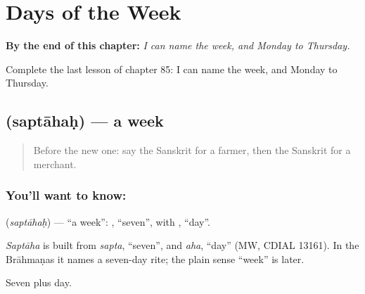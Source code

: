 
\chapter{Days of the Week}
\label{ch:sa-days-of-the-week}

\begin{chapteropening}
\textbf{By the end of this chapter:} \emph{I can name the week, and Monday to Thursday.}

Complete the last lesson of chapter 85: I can name the week, and Monday to Thursday.
\end{chapteropening}

\section[\texorpdfstring{\sk{सप्ताहः} (saptāhaḥ)}{सप्ताहः (saptāhaḥ)}]{ (saptāhaḥ) — a week}

\label{lesson:SA-C85-week}



\begin{quote}
Before the new one: say the Sanskrit for a farmer, then the Sanskrit for a merchant.
\end{quote}

\subsection*{You'll want to know: }
\textbf{} (\emph{saptāhaḥ}) — \textquotedblleft{}a week\textquotedblright{}: \textbf{}, \textquotedblleft{}seven\textquotedblright{}, with \textbf{}, \textquotedblleft{}day\textquotedblright{}.

\begin{cousinweb}
\emph{Saptāha} is built from \emph{sapta}, \textquotedblleft{}seven\textquotedblright{}, and \emph{aha}, \textquotedblleft{}day\textquotedblright{} (MW, CDIAL 13161). In the Brāhmaṇas it names a seven-day rite; the plain sense \textquotedblleft{}week\textquotedblright{} is later.
\end{cousinweb}

\begin{grammarlens}[title={What you've built}]
Seven plus day.
\end{grammarlens}

